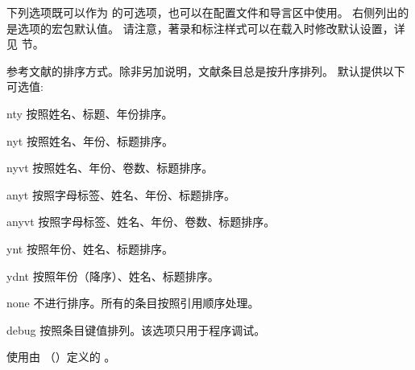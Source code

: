 
下列选项既可以作为  的可选项，也可以在配置文件和导言区中使用。
右侧列出的是选项的宏包默认值。
请注意，著录和标注样式可以在载入时修改默认设置，详见  节。

\begin{optionlist}


参考文献的排序方式。除非另加说明，文献条目总是按升序排列。
默认提供以下可选值:

\begin{valuelist}
\item[nty] %
按照姓名、标题、年份排序。
\item[nyt] %
按照姓名、年份、标题排序。
\item[nyvt] %
按照姓名、年份、卷数、标题排序。
\item[anyt] %
按照字母标签、姓名、年份、标题排序。
\item[anyvt] %
按照字母标签、姓名、年份、卷数、标题排序。
\item[ynt] %
按照年份、姓名、标题排序。
\item[ydnt] %
按照年份（降序）、姓名、标题排序。
\item[none] %
不进行排序。所有的条目按照引用顺序处理。
\item[debug] %
按照条目键值排列。该选项只用于程序调试。
\item[\prm{name}] %
使用由 （）定义的 。
\end{valuelist}


\end{optionlist}
